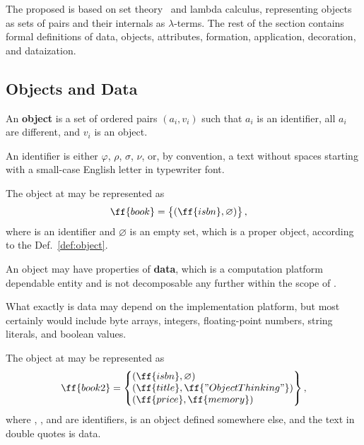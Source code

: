 The proposed \phic{} is based on set theory~\citep{jech2013set} and lambda calculus,
representing objects as sets of pairs and their internals as \(\lambda\)-terms.
The rest of the section contains formal definitions of
data, objects, attributes, formation, application, decoration, and dataization.

\subsection{Objects and Data}

\begin{definition}\label{def:object}
An \textbf{object} is a set of ordered pairs \((a_i, v_i)\) such that
\(a_i\) is an identifier, all \(a_i\) are different, and \(v_i\) is an object.
\end{definition}

An identifier is either \(\varphi\), \(\rho\), \(\sigma\), \(\nu\), or, by convention, a text without
spaces starting with a small-case English letter in typewriter font.

The object at  may be represented as
\begin{equation}\label{eq:book}
\begin{split}
\ff{book} & = \left\{\begin{matrix*}[l]
  (\ff{isbn}, \varnothing) \\
\end{matrix*}\right\},
\end{split}
\end{equation}
where  is an identifier and \(\varnothing\) is an empty
set, which is a proper object, according to the Def.~\ref{def:object}.

\begin{definition}\label{def:data}
An object may have properties of \textbf{data},
which is a computation platform dependable entity and is not
decomposable any further within the scope of \phic{}.
\end{definition}

What exactly is data may depend on the
implementation platform, but most certainly would include
byte arrays, integers, floating-point numbers,
string literals, and boolean values.

The object at  may be represented as
\begin{equation}\label{eq:book2}
\begin{split}
\ff{book2} & = \left\{\begin{matrix*}[l]
  (\ff{isbn}, \varnothing) \\
  (\ff{title}, \ff{"Object Thinking"}) \\
  (\ff{price}, \ff{memory}) \\
\end{matrix*}\right\}, \\
\end{split}
\end{equation}
where , , and  are identifiers,
 is an object defined somewhere else,
and the text in double quotes is data.

